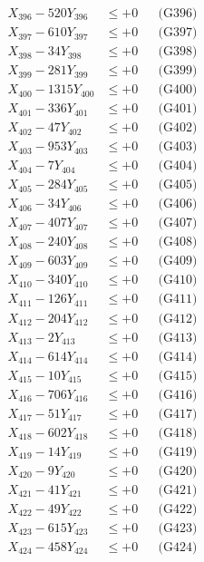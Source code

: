 \documentclass[a4paper,10pt]{article}
\begin{document}
{\begin{align}
X_{396} - 520Y_{396} &\leq +0 && \text{(G396)} \\
X_{397} - 610Y_{397} &\leq +0 && \text{(G397)} \\
X_{398} - 34Y_{398} &\leq +0 && \text{(G398)} \\
X_{399} - 281Y_{399} &\leq +0 && \text{(G399)} \\
X_{400} - 1315Y_{400} &\leq +0 && \text{(G400)} \\
\allowbreak
X_{401} - 336Y_{401} &\leq +0 && \text{(G401)} \\
X_{402} - 47Y_{402} &\leq +0 && \text{(G402)} \\
X_{403} - 953Y_{403} &\leq +0 && \text{(G403)} \\
X_{404} - 7Y_{404} &\leq +0 && \text{(G404)} \\
X_{405} - 284Y_{405} &\leq +0 && \text{(G405)} \\
X_{406} - 34Y_{406} &\leq +0 && \text{(G406)} \\
X_{407} - 407Y_{407} &\leq +0 && \text{(G407)} \\
X_{408} - 240Y_{408} &\leq +0 && \text{(G408)} \\
X_{409} - 603Y_{409} &\leq +0 && \text{(G409)} \\
X_{410} - 340Y_{410} &\leq +0 && \text{(G410)} \\
\allowbreak
X_{411} - 126Y_{411} &\leq +0 && \text{(G411)} \\
X_{412} - 204Y_{412} &\leq +0 && \text{(G412)} \\
X_{413} - 2Y_{413} &\leq +0 && \text{(G413)} \\
X_{414} - 614Y_{414} &\leq +0 && \text{(G414)} \\
X_{415} - 10Y_{415} &\leq +0 && \text{(G415)} \\
X_{416} - 706Y_{416} &\leq +0 && \text{(G416)} \\
X_{417} - 51Y_{417} &\leq +0 && \text{(G417)} \\
X_{418} - 602Y_{418} &\leq +0 && \text{(G418)} \\
X_{419} - 14Y_{419} &\leq +0 && \text{(G419)} \\
X_{420} - 9Y_{420} &\leq +0 && \text{(G420)} \\
\allowbreak
X_{421} - 41Y_{421} &\leq +0 && \text{(G421)} \\
X_{422} - 49Y_{422} &\leq +0 && \text{(G422)} \\
X_{423} - 615Y_{423} &\leq +0 && \text{(G423)} \\
X_{424} - 458Y_{424} &\leq +0 && \text{(G424)} \\

\end{align}}
\end{document}
